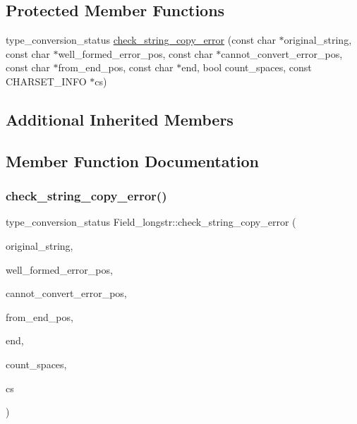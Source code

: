 \subsection*{Protected Member Functions}
\begin{DoxyCompactItemize}
\item 
type\+\_\+conversion\+\_\+status \mbox{\hyperlink{classField__longstr_af5afb63fcdf0442275a5a741768cf81a}{check\+\_\+string\+\_\+copy\+\_\+error}} (const char $\ast$original\+\_\+string, const char $\ast$well\+\_\+formed\+\_\+error\+\_\+pos, const char $\ast$cannot\+\_\+convert\+\_\+error\+\_\+pos, const char $\ast$from\+\_\+end\+\_\+pos, const char $\ast$end, bool count\+\_\+spaces, const C\+H\+A\+R\+S\+E\+T\+\_\+\+I\+N\+FO $\ast$cs)
\end{DoxyCompactItemize}
\subsection*{Additional Inherited Members}


\subsection{Member Function Documentation}
\mbox{\label{classField__longstr_af5afb63fcdf0442275a5a741768cf81a}} 
\subsubsection{\texorpdfstring{check\+\_\+string\+\_\+copy\+\_\+error()}{check\_string\_copy\_error()}}
{\footnotesize\ttfamily type\+\_\+conversion\+\_\+status Field\+\_\+longstr\+::check\+\_\+string\+\_\+copy\+\_\+error (\begin{DoxyParamCaption}\item[{const char $\ast$}]{original\+\_\+string,  }\item[{const char $\ast$}]{well\+\_\+formed\+\_\+error\+\_\+pos,  }\item[{const char $\ast$}]{cannot\+\_\+convert\+\_\+error\+\_\+pos,  }\item[{const char $\ast$}]{from\+\_\+end\+\_\+pos,  }\item[{const char $\ast$}]{end,  }\item[{bool}]{count\+\_\+spaces,  }\item[{const C\+H\+A\+R\+S\+E\+T\+\_\+\+I\+N\+FO $\ast$}]{cs }\end{DoxyParamCaption})\hspace{0.3cm}{\ttfamily [protected]}}

